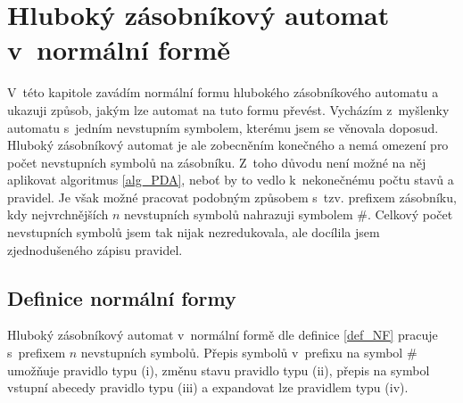 \chapter{Hluboký zásobníkový automat v~normální formě} \label{kap_pda_NF}

V~této kapitole zavádím normální formu hlubokého zásobníkového automatu a ukazuji způsob, jakým lze automat na tuto formu převést. Vycházím z~myšlenky automatu s~jedním nevstupním symbolem, kterému jsem se věnovala doposud. Hluboký zásobníkový automat je ale zobecněním konečného a nemá omezení pro počet nevstupních symbolů na zásobníku. Z~toho důvodu není možné na něj aplikovat algoritmus \ref{alg_PDA}, neboť by to vedlo k~nekonečnému počtu stavů a pravidel. Je však možné pracovat podobným způsobem s~tzv. prefixem zásobníku, kdy nejvrchnějších $n$ nevstupních symbolů nahrazuji symbolem $\#$. Celkový počet nevstupních symbolů jsem tak nijak nezredukovala, ale docílila jsem zjednodušeného zápisu pravidel.




\section{Definice normální formy}

Hluboký zásobníkový automat v~normální formě dle definice \ref{def_NF} pracuje s~prefixem $n$ nevstupních symbolů. Přepis symbolů v~prefixu na symbol $\#$ umožňuje pravidlo typu (i), změnu stavu pravidlo typu (ii), přepis na symbol vstupní abecedy pravidlo typu (iii) a expandovat lze pravidlem typu (iv). 

